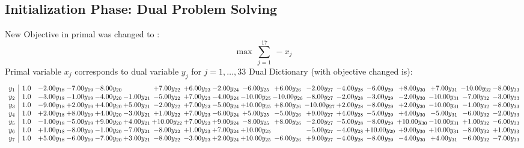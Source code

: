\documentclass[9pt]{article}
\begin{document}
\subsection{Initialization Phase: Dual Problem Solving}
New Objective in primal was changed to : \[ \max\ \sum_{j=1}^{17}\ - x_j \] 
Primal variable $x_j$ corresponds to dual variable $y_j$ for $j = 1,\ldots,33$
Dual Dictionary (with objective changed is): 
\[\begin{array}{c| c c@{\hskip 2pt} c@{\hskip 2pt} c@{\hskip 2pt} c@{\hskip 2pt} c@{\hskip 2pt} c@{\hskip 2pt} c@{\hskip 2pt} c@{\hskip 2pt} c@{\hskip 2pt} c@{\hskip 2pt} c@{\hskip 2pt} c@{\hskip 2pt} c@{\hskip 2pt} c@{\hskip 2pt} c@{\hskip 2pt} c@{\hskip 2pt} }
 y_{1}   &  1.0 & -2.00 y_{18} & -7.00 y_{19} & -8.00 y_{20} &   & +  7.00 y_{22} & +  6.00 y_{23} & -2.00 y_{24} & -6.00 y_{25} & +  6.00 y_{26} & -2.00 y_{27} & -4.00 y_{28} & -6.00 y_{29} & +  8.00 y_{30} & +  7.00 y_{31} & -10.00 y_{32} & -8.00 y_{33}\\
 y_{2}   &  1.0 & -3.00 y_{18} & -1.00 y_{19} & -4.00 y_{20} & -1.00 y_{21} & -5.00 y_{22} & +  7.00 y_{23} & -4.00 y_{24} & -10.00 y_{25} & -10.00 y_{26} & -8.00 y_{27} & -2.00 y_{28} & -3.00 y_{29} & -2.00 y_{30} & -10.00 y_{31} & -7.00 y_{32} & -3.00 y_{33}\\
 y_{3}   &  1.0 & -9.00 y_{18} & +  2.00 y_{19} & +  4.00 y_{20} & +  5.00 y_{21} & -2.00 y_{22} & +  7.00 y_{23} & -5.00 y_{24} & + 10.00 y_{25} & +  8.00 y_{26} & -10.00 y_{27} & +  2.00 y_{28} & -8.00 y_{29} & +  2.00 y_{30} & -10.00 y_{31} & -1.00 y_{32} & -8.00 y_{33}\\
 y_{4}   &  1.0 & +  2.00 y_{18} & +  8.00 y_{19} & +  4.00 y_{20} & -3.00 y_{21} & +  1.00 y_{22} & +  7.00 y_{23} & -6.00 y_{24} & +  5.00 y_{25} & -5.00 y_{26} & +  9.00 y_{27} & +  4.00 y_{28} & -5.00 y_{29} & +  4.00 y_{30} & -5.00 y_{31} & -6.00 y_{32} & -2.00 y_{33}\\
 y_{5}   &  1.0 & -1.00 y_{18} & -5.00 y_{19} & +  9.00 y_{20} & +  4.00 y_{21} & + 10.00 y_{22} & +  7.00 y_{23} & +  9.00 y_{24} & -8.00 y_{25} & +  8.00 y_{26} & -2.00 y_{27} & -5.00 y_{28} & -8.00 y_{29} & + 10.00 y_{30} & -10.00 y_{31} & +  1.00 y_{32} & -6.00 y_{33}\\
 y_{6}   &  1.0 & +  1.00 y_{18} & -8.00 y_{19} & -1.00 y_{20} & -7.00 y_{21} & -8.00 y_{22} & +  1.00 y_{23} & +  7.00 y_{24} & + 10.00 y_{25} &   & -5.00 y_{27} & -4.00 y_{28} & + 10.00 y_{29} & +  9.00 y_{30} & + 10.00 y_{31} & -8.00 y_{32} & +  1.00 y_{33}\\
 y_{7}   &  1.0 & +  5.00 y_{18} & -6.00 y_{19} & -7.00 y_{20} & +  3.00 y_{21} & -8.00 y_{22} & -3.00 y_{23} & +  2.00 y_{24} & + 10.00 y_{25} & -6.00 y_{26} & +  9.00 y_{27} & -4.00 y_{28} & -8.00 y_{29} & -4.00 y_{30} & +  4.00 y_{31} & -6.00 y_{32} & -7.00 y_{33}\\

\end{array}\]
\end{document}
